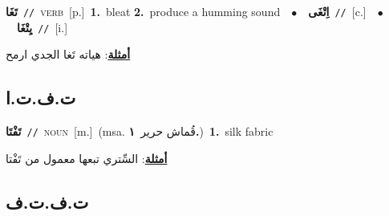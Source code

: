 \documentclass[10pt,a4paper,twoside]{article} %
\begin{document}
\begin{multicols}{2}
{\setlength\topsep{0pt}\textbf{\foreignlanguage{arabic}{تَغَا}}\ {\color{gray}\texttt{//}\color{black}}\ \textsc{verb}\ [p.]\ \textbf{1.}~bleat  \textbf{2.}~produce a humming sound\ \ $\bullet$\ \ \setlength\topsep{0pt}\textbf{\foreignlanguage{arabic}{اِتْغَى}}\ {\color{gray}\texttt{//}\color{black}}\ [c.]\ \ $\bullet$\ \ \setlength\topsep{0pt}\textbf{\foreignlanguage{arabic}{يِتْغَا}}\ {\color{gray}\texttt{//}\color{black}}\ [i.]\  \begin{flushright}\color{gray}\foreignlanguage{arabic}{\textbf{\underline{\foreignlanguage{arabic}{أمثلة}}}: هياته تَغا الجدي ارمح}\end{flushright}\color{black}} \vspace{2mm}

\vspace{-3mm}
\subsection*{\color{blue}\foreignlanguage{arabic}{ت.ف.ت.ا}\color{blue}{ (ntws)}} 

{\setlength\topsep{0pt}\textbf{\foreignlanguage{arabic}{تَفْتَا}}\ {\color{gray}\texttt{//}\color{black}}\ \textsc{noun}\ [m.]\ \color{gray}(msa. \foreignlanguage{arabic}{قُماش حرير}~\foreignlanguage{arabic}{\textbf{١.}})\color{black}\ \textbf{1.}~silk fabric\  \begin{flushright}\color{gray}\foreignlanguage{arabic}{\textbf{\underline{\foreignlanguage{arabic}{أمثلة}}}: السِّتري تبعها معمول من تَفْتا}\end{flushright}\color{black}} \vspace{2mm}

\vspace{-3mm}
\subsection*{\color{blue}\foreignlanguage{arabic}{ت.ف.ت.ف}\color{blue}{}} 


\end{multicols}
\end{document}
